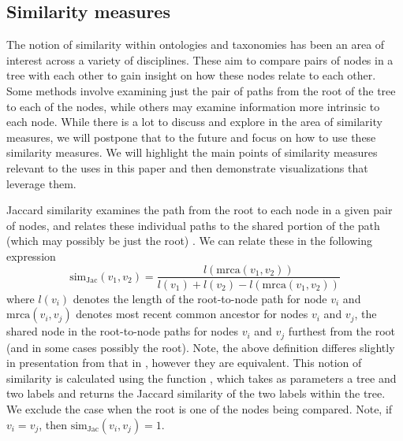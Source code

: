 \documentclass[article]{jss}
\newcommand{\fct}[1]{\code{#1()}}
\begin{document}
\subsection{Similarity measures} \label{sec:simmeasures}

The notion of similarity within ontologies and taxonomies has been an area of interest across a variety of disciplines. These aim to compare pairs of nodes in a tree with each other to gain insight on how these nodes relate to each other. Some methods involve examining just the pair of paths from the root of the tree to each of the nodes, while others may examine information more intrinsic to each node. While there is a lot to discuss and explore in the area of similarity measures, we will postpone that to the future and focus on how to use these similarity measures. We will highlight the main points of similarity measures relevant to the uses in this paper and then demonstrate visualizations that leverage them.

Jaccard similarity examines the path from the root to each node in a given pair of nodes, and relates these individual paths to the shared portion of the path (which may possibly be just the root) \cite{pekar2002taxonomy}. We can relate these in the following expression $$\textrm{sim}_{\textrm{Jac}}(v_1, v_2) = \frac{l(\textrm{mrca}(v_1, v_2))}{l(v_1) + l(v_2) - l(\textrm{mrca}(v_1, v_2))}$$ where $l(v_i)$ denotes the length of the root-to-node path for node $v_i$ and $\textrm{mrca}(v_i, v_j)$ denotes most recent common ancestor for nodes $v_i$ and $v_j$, the shared node in the root-to-node paths for nodes $v_i$ and $v_j$ furthest from the root (and in some cases possibly the root). Note, the above definition differes slightly in presentation from that in \cite{pekar2002taxonomy}, however they are equivalent. This notion of similarity is calculated using the function \fct{general\_Jaccard\_similarity}, which takes as parameters a tree and two labels and returns the Jaccard similarity of the two labels within the tree. We exclude the case when the root is one of the nodes being compared. Note, if $v_i = v_j$, then $\textrm{sim}_{\textrm{Jac}}(v_i, v_j) = 1$.
\end{document}

